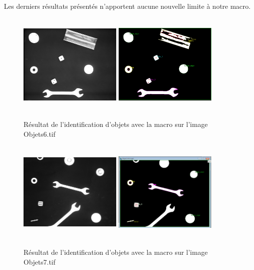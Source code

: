 \documentclass{scrreprt}
\begin{document}
Les derniers résultats présentés n'apportent aucune nouvelle limite à notre macro.
\begin{figure}[!h]
\centering
\includegraphics[width=5cm, height=5cm]{images/objet6o.png}\hfill
\includegraphics[width=5cm, height=5cm]{images/objet6.png}
\caption{Résultat de l'identification d'objets avec la macro sur l'image Objets6.tif}
\end{figure}

\begin{figure}[!h]
\centering
\includegraphics[width=5cm, height=5cm]{images/objet7o.png}\hfill
\includegraphics[width=5cm, height=5cm]{images/objet7.png}
\caption{Résultat de l'identification d'objets avec la macro sur l'image Objets7.tif}
\end{figure}
\end{document}
